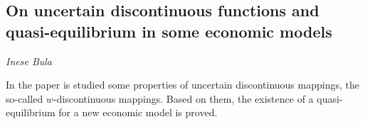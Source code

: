\documentclass[../booklet.tex]{subfiles}
\begin{document}
\subsection[On uncertain discontinuous functions and quasi-equilibrium in some economic models. {\it Inese Bula}]{On uncertain discontinuous functions and quasi-equilibrium in some economic models}

\begin{center}
  {\it Inese Bula}
\end{center}

\vskip 0.8cm


In the paper is studied some properties of uncertain discontinuous mappings, the so-called $w$-discontinuous mappings. Based on them, the existence of a quasi-equilibrium for a new economic model is proved.
\end{document}
